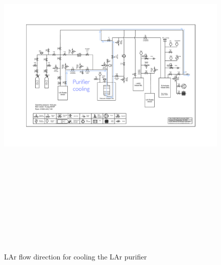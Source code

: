 \documentclass[letterpaper,11pt]{article}
\begin{document}
\begin{figure}[htb]
\begin{center}
\includegraphics[angle=90,origin=c,height=7.2in]{fig/PurifierCooling_PIDv8.3.pdf}
\caption{LAr flow direction for cooling the LAr purifier}
\end{center}
\end{figure}
\clearpage
\end{document}
